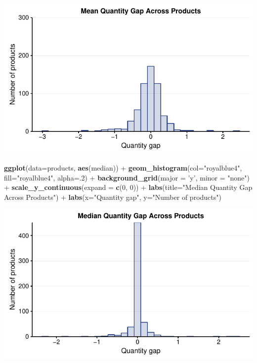 \documentclass[10pt,]{article}
\newenvironment{Shaded}{\begin{snugshade}}{\end{snugshade}}
\newcommand{\KeywordTok}[1]{\textcolor[rgb]{0.13,0.29,0.53}{\textbf{{#1}}}}
\newcommand{\DataTypeTok}[1]{\textcolor[rgb]{0.13,0.29,0.53}{{#1}}}
\newcommand{\DecValTok}[1]{\textcolor[rgb]{0.00,0.00,0.81}{{#1}}}
\newcommand{\StringTok}[1]{\textcolor[rgb]{0.31,0.60,0.02}{{#1}}}
\newcommand{\NormalTok}[1]{{#1}}
\begin{document}
\begin{center}\includegraphics{Figs/quantity_products-1} \end{center}

\begin{Shaded}
\begin{Highlighting}[]
\KeywordTok{ggplot}\NormalTok{(}\DataTypeTok{data=}\NormalTok{products, }\KeywordTok{aes}\NormalTok{(median)) +}
\StringTok{  }\KeywordTok{geom_histogram}\NormalTok{(}\DataTypeTok{col=}\StringTok{"royalblue4"}\NormalTok{,}
                 \DataTypeTok{fill=}\StringTok{"royalblue4"}\NormalTok{,}
                 \DataTypeTok{alpha=}\NormalTok{.}\DecValTok{2}\NormalTok{) +}
\StringTok{  }\KeywordTok{background_grid}\NormalTok{(}\DataTypeTok{major =} \StringTok{'y'}\NormalTok{, }\DataTypeTok{minor =} \StringTok{"none"}\NormalTok{) +}
\StringTok{  }\KeywordTok{scale_y_continuous}\NormalTok{(}\DataTypeTok{expand =} \KeywordTok{c}\NormalTok{(}\DecValTok{0}\NormalTok{, }\DecValTok{0}\NormalTok{)) +}
\StringTok{  }\KeywordTok{labs}\NormalTok{(}\DataTypeTok{title=}\StringTok{"Median Quantity Gap Across Products"}\NormalTok{) +}
\StringTok{  }\KeywordTok{labs}\NormalTok{(}\DataTypeTok{x=}\StringTok{"Quantity gap"}\NormalTok{, }\DataTypeTok{y=}\StringTok{"Number of products"}\NormalTok{)}
\end{Highlighting}
\end{Shaded}

\begin{center}\includegraphics{Figs/quantity_products-2} \end{center}
\end{document}
